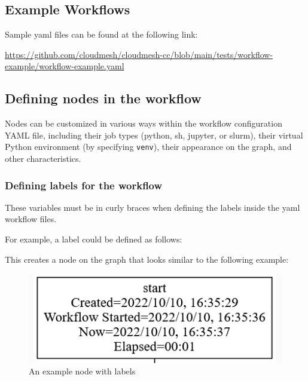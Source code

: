 \hypertarget{example-workflows}{%
\subsection{Example Workflows}\label{example-workflows}}

Sample yaml files can be found at the following link:

\url{https://github.com/cloudmesh/cloudmesh-cc/blob/main/tests/workflow-example/workflow-example.yaml}

\hypertarget{defining-nodes-in-the-workflow}{%
\subsection{Defining nodes in the
workflow}\label{defining-nodes-in-the-workflow}}

Nodes can be customized in various ways within the workflow
configuration YAML file, including their job types (python, sh, jupyter,
or slurm), their virtual Python environment (by specifying
\texttt{venv}), their appearance on the graph, and other
characteristics.

\hypertarget{defining-labels-for-the-workflow}{%
\subsubsection{Defining labels for the
workflow}\label{defining-labels-for-the-workflow}}

These variables must be in curly braces when defining the labels inside
the yaml workflow files.

For example, a label could be defined as follows:

\begin{Shaded}
\begin{Highlighting}[]
\end{Highlighting}
\end{Shaded}

This creates a node on the graph that looks similar to the following
example:

\begin{figure}
\centering
\includegraphics{images/labelmaker-example.png}
\caption{An example node with labels}
\end{figure}

